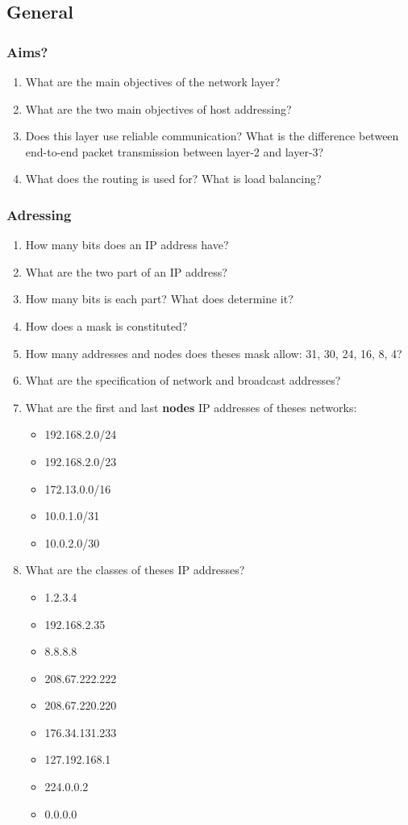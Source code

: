 \documentclass[11pt]{article}
\begin{document}
\subsection{General}
\subsubsection{Aims?}
\begin{enumerate}
  \item What are the main objectives of the network layer?
  \item What are the two main objectives of host addressing?
  \item Does this layer use reliable communication? What is the difference between end-to-end packet transmission between layer-2 and layer-3?
  \item What does the routing is used for? What is load balancing?
\end{enumerate}
\subsubsection{Adressing}
\begin{enumerate}
  \item How many bits does an IP address have?
  \item What are the two part of an IP address?
  \item How many bits is each part? What does determine it?
  \item How does a mask is constituted?
  \item How many addresses and nodes does theses mask allow: 31, 30, 24, 16, 8, 4?
  \item What are the specification of network and broadcast addresses?
  \item What are the first and last \textbf{nodes} IP addresses of theses networks:
    \begin{itemize}
      \item 192.168.2.0/24
      \item 192.168.2.0/23
      \item 172.13.0.0/16
      \item 10.0.1.0/31
      \item 10.0.2.0/30
    \end{itemize}
  \item What are the classes of theses IP addresses?
    \begin{itemize}
      \item 1.2.3.4
      \item 192.168.2.35
      \item 8.8.8.8
      \item 208.67.222.222
      \item 208.67.220.220
      \item 176.34.131.233
      \item 127.192.168.1
      \item 224.0.0.2
      \item 0.0.0.0
    \end{itemize}
\end{enumerate}
\end{document}
